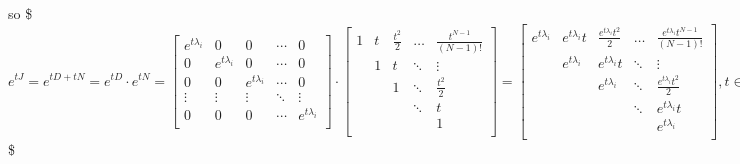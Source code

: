 \documentclass[letterpaper,10pt,english]{jupyterBook}
\begin{document}
\sphinxAtStartPar
so
\$\(
    e^{tJ} = e^{tD+tN} = e^{tD} \cdot e^{tN} = \left[ {\begin{array}{ccccc}
    e^{t \lambda_i} & 0 & 0 & \dotsm & 0\\
    0 & e^{t \lambda_i} & 0 & \dotsm & 0\\
    0 & 0 & e^{t \lambda_i} & \dotsm & 0\\
    \vdots & \vdots & \vdots & \ddots & \vdots\\
    0 & 0 & 0 & \dotsm & e^{t \lambda_i}\\
\end{array} } \right] \cdot \left[ {\begin{array}{ccccc}
    1 & t & \frac{t^2}{2} & \dotsc & \frac{t^{N-1}}{(N-1)!}\\
     & 1 & t & \ddots & \vdots\\
     &  & 1 & \ddots & \frac{t^2}{2} \\
     &  &  & \ddots & t \\
     &  &  &  & 1 \\
\end{array} } \right] = \left[ {\begin{array}{ccccc}
    e^{t \lambda_i} & e^{t \lambda_i}t & \frac{e^{t \lambda_i} t^2}{2} & \dotsc & \frac{e^{t \lambda_i} t^{N-1}}{(N-1)!}\\
     & e^{t \lambda_i} & e^{t \lambda_i} t & \ddots & \vdots\\
     &  & e^{t \lambda_i} & \ddots & \frac{e^{t \lambda_i} t^2}{2} \\
     &  &  & \ddots & e^{t \lambda_i} t \\
     &  &  &  & e^{t \lambda_i} \\
\end{array} } \right], t \in \mathbb{R}.
\)\$
\end{document}
